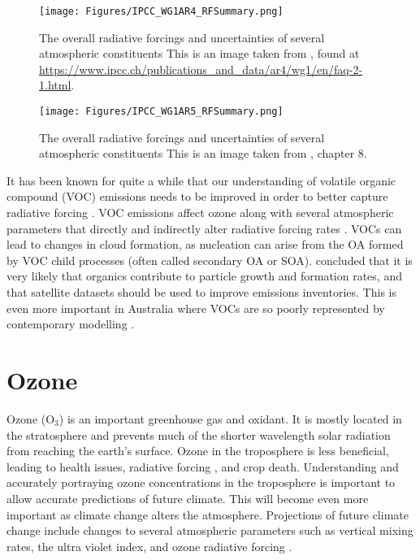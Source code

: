     \begin{figure}
      \texttt{[image: Figures/IPCC\_WG1AR4\_RFSummary.png]}
      \caption{%
        The overall radiative forcings and uncertainties of several atmospheric constituents
        This is an image taken from \textcite{IPCC_Chapter2}, found at \url{https://www.ipcc.ch/publications_and_data/ar4/wg1/en/faq-2-1.html}.}
     \label{LR:VOCs:IsopCascade:RF:fig_IPCC_RF_AR4}
    \end{figure}
    
    \begin{figure}
      \texttt{[image: Figures/IPCC\_WG1AR5\_RFSummary.png]}
      \caption{%
        The overall radiative forcings and uncertainties of several atmospheric constituents
        This is an image taken from \textcite{IPCC_AR5_WG1}, chapter 8.}
      \label{LR:VOCs:IsopCascade:RF:fig_IPCC_RF_AR5}
    \end{figure}    
    
    
    It has been known for quite a while that our understanding of volatile organic compound (VOC) emissions needs to be improved in order to better capture radiative forcing \parencite{Kanakidou2005}.
    VOC emissions affect ozone along with several atmospheric parameters that directly and indirectly alter radiative forcing rates \parencite[e.g.][]{Arneth2008}.
    VOCs can lead to changes in cloud formation, as nucleation can arise from the OA formed by VOC child processes (often called secondary OA or SOA).
    \textcite{Kanakidou2005} concluded that it is very likely that organics contribute to particle growth and formation rates, and that satellite datasets should be used to improve emissions inventories.
    This is even more important in Australia where VOCs are so poorly represented by contemporary modelling \parencite{Emmerson2016}.

\section{Ozone}
\label{LR:O3}
  
  Ozone (O$_3$) is an important greenhouse gas and oxidant.
  It is mostly located in the stratosphere and prevents much of the shorter wavelength solar radiation from reaching the earth's surface.
  Ozone in the troposphere is less beneficial, leading to health issues, radiative forcing \parencite{Stevenson2013}, and crop death.
  Understanding and accurately portraying ozone concentrations in the troposphere is important to allow accurate predictions of future climate.
  This will become even more important as climate change alters the atmosphere.
  Projections of future climate change include changes to several atmospheric parameters such as vertical mixing rates, the ultra violet index, and ozone radiative forcing \parencite{Hegglin2009}.
  
